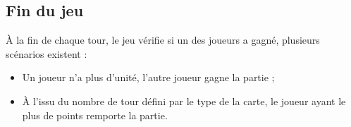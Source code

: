 \documentclass[a4paper,12pt]{article}
\begin{document}
\subsection{Fin du jeu}
À la fin de chaque tour, le jeu vérifie si un des joueurs a gagné, plusieurs scénarios existent :
\begin{itemize}
\item Un joueur n'a plus d'unité, l'autre joueur gagne la partie ;
\item À l'issu du nombre de tour défini par le type de la carte, le joueur ayant le plus de points remporte la partie.
\end{itemize}
\end{document}
